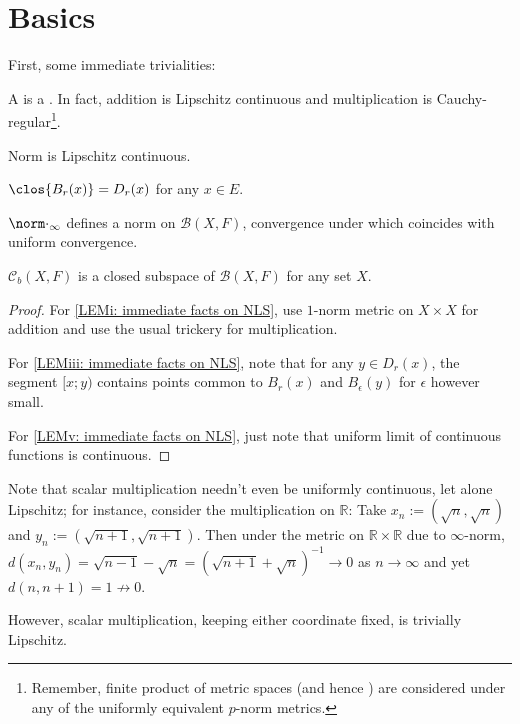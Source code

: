 \section{Basics}

	First, some immediate trivialities:

	\begin{lem}\label{LEM: immediate facts on NLS}
		\begin{mylist}
			\item\label{LEMi: immediate facts on NLS} A \NLS is a \TVS. In fact, addition is Lipschitz continuous and multiplication is Cauchy-regular\footnote{
				Remember, finite product of metric spaces (and hence ) are considered under any of the uniformly equivalent $p$-norm metrics.
			}.
			
			\item Norm is Lipschitz continuous.
			
			\item\label{LEMiii: immediate facts on NLS} $\clos{B_r(x)} = D_r(x)$ for any $x\in E$.
			
			\item $\norm\cdot_\infty$ defines a norm on $\mathcal B(X, F)$, convergence under which coincides with uniform convergence.
			
			\item\label{LEMv: immediate facts on NLS} $\mathcal C_b(X, F)$ is a closed subspace of $\mathcal B(X, F)$ for any set $X$.
		\end{mylist}
	\end{lem}
	
	\begin{proof}
		For \ref{LEMi: immediate facts on NLS}, use $1$-norm metric on $X\times X$ for addition and use the usual trickery for multiplication.
		
		For \ref{LEMiii: immediate facts on NLS}, note that for any $y\in D_r(x)$, the segment $[x; y)$ contains points common to $B_r(x)$ and $B_\epsilon(y)$ for $\epsilon$ however small.
		
		For \ref{LEMv: immediate facts on NLS}, just note that uniform limit of continuous functions is continuous.
	\end{proof}
	
	\begin{rmk}
		Note that scalar multiplication needn't even be uniformly continuous, let alone Lipschitz; for instance, consider the multiplication on $\mathbb R$: Take $x_n := (\sqrt n, \sqrt n)$ and $y_n := (\sqrt{n + 1}, \sqrt{n + 1})$. Then under the metric on $\mathbb R\times\mathbb R$ due to $\infty$-norm, $d(x_n, y_n) = \sqrt{n - 1} - \sqrt n = (\sqrt{n + 1} + \sqrt n)^{-1}\to 0$ as $n\to \infty$ and yet $d(n, n + 1) = 1\not\to 0$.
		
		However, scalar multiplication, keeping either coordinate fixed, is trivially Lipschitz.
	\end{rmk}
	
